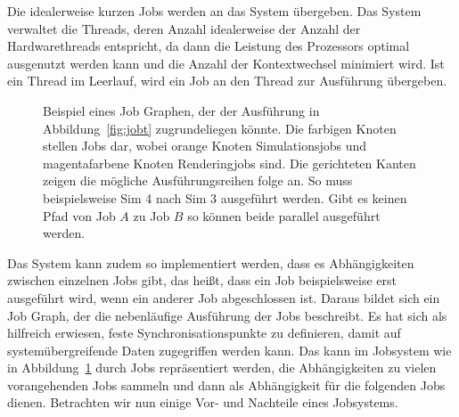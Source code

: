 Die idealerweise kurzen Jobs werden an das System übergeben. Das System verwaltet die Threads, deren Anzahl idealerweise der Anzahl der Hardwarethreads entspricht, da dann die Leistung des Prozessors optimal ausgenutzt werden kann und die Anzahl der Kontextwechsel minimiert wird. Ist ein Thread im Leerlauf, wird ein Job an den Thread zur Ausführung übergeben.

\begin{figure}
	\centering
	\caption{Beispiel eines Job Graphen, der der Ausführung in Abbildung~\ref{fig:jobt} zugrundeliegen könnte. Die farbigen Knoten stellen Jobs dar, wobei orange Knoten Simulationsjobs und magentafarbene Knoten Renderingjobs sind. Die gerichteten Kanten zeigen die mögliche Ausführungsreihen folge an. So muss beispielsweise Sim 4 nach Sim 3 ausgeführt werden. Gibt es keinen Pfad von Job $A$ zu Job $B$ so können beide parallel ausgeführt werden.}\label{fig:jobdependencies}
\end{figure}
Das System kann zudem so implementiert werden, dass es Abhängigkeiten zwischen einzelnen Jobs gibt, das heißt, dass ein Job beispielsweise erst ausgeführt wird, wenn ein anderer Job abgeschlossen ist. Daraus bildet sich ein Job Graph, der die nebenläufige Ausführung der Jobs beschreibt. Es hat sich als hilfreich erwiesen, feste Synchronisationspunkte zu definieren, damit auf systemübergreifende Daten zugegriffen werden kann. Das kann im Jobsystem wie in Abbildung~\ref{fig:jobdependencies} durch Jobs repräsentiert werden, die Abhängigkeiten zu vielen vorangehenden Jobs sammeln und dann als Abhängigkeit für die folgenden Jobs dienen. Betrachten wir nun einige Vor- und Nachteile eines Jobsystems.
